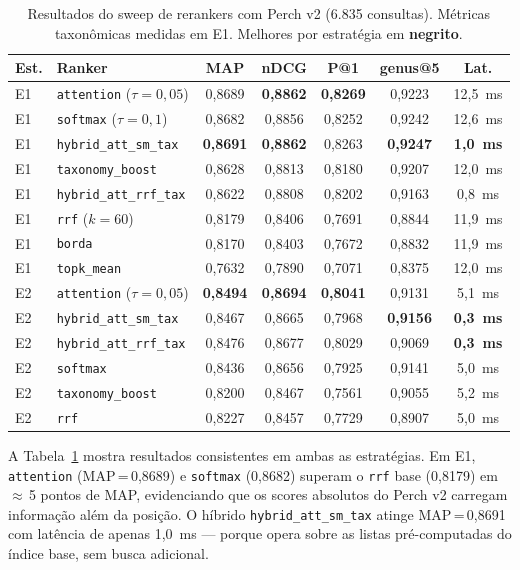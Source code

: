 \documentclass[12pt]{article}
\begin{document}
\begin{table}[H]
\centering
\caption{Resultados do sweep de rerankers com Perch v2 (6.835 consultas).
Métricas taxonômicas medidas em E1. Melhores por estratégia em \textbf{negrito}.}
\label{tab:sweep_perch}
\begin{tabular}{llccccc}
\toprule
\textbf{Est.} & \textbf{Ranker} & \textbf{MAP} & \textbf{nDCG} & \textbf{P@1} & \textbf{genus@5} & \textbf{Lat.} \\
\midrule
E1 & \texttt{attention} ($\tau=0{,}05$)   & 0,8689 & \textbf{0,8862} & \textbf{0,8269} & 0,9223 & 12,5~ms \\
E1 & \texttt{softmax} ($\tau=0{,}1$)      & 0,8682 & 0,8856 & 0,8252 & 0,9242 & 12,6~ms \\
E1 & \texttt{hybrid\_att\_sm\_tax}         & \textbf{0,8691} & \textbf{0,8862} & 0,8263 & \textbf{0,9247} & \textbf{1,0~ms} \\
E1 & \texttt{taxonomy\_boost}             & 0,8628 & 0,8813 & 0,8180 & 0,9207 & 12,0~ms \\
E1 & \texttt{hybrid\_att\_rrf\_tax}        & 0,8622 & 0,8808 & 0,8202 & 0,9163 & 0,8~ms \\
E1 & \texttt{rrf} ($k=60$)                & 0,8179 & 0,8406 & 0,7691 & 0,8844 & 11,9~ms \\
E1 & \texttt{borda}                        & 0,8170 & 0,8403 & 0,7672 & 0,8832 & 11,9~ms \\
E1 & \texttt{topk\_mean}                   & 0,7632 & 0,7890 & 0,7071 & 0,8375 & 12,0~ms \\
\midrule
E2 & \texttt{attention} ($\tau=0{,}05$)   & \textbf{0,8494} & \textbf{0,8694} & \textbf{0,8041} & 0,9131 & 5,1~ms \\
E2 & \texttt{hybrid\_att\_sm\_tax}         & 0,8467 & 0,8665 & 0,7968 & \textbf{0,9156} & \textbf{0,3~ms} \\
E2 & \texttt{hybrid\_att\_rrf\_tax}        & 0,8476 & 0,8677 & 0,8029 & 0,9069 & \textbf{0,3~ms} \\
E2 & \texttt{softmax}                      & 0,8436 & 0,8656 & 0,7925 & 0,9141 & 5,0~ms \\
E2 & \texttt{taxonomy\_boost}             & 0,8200 & 0,8467 & 0,7561 & 0,9055 & 5,2~ms \\
E2 & \texttt{rrf}                          & 0,8227 & 0,8457 & 0,7729 & 0,8907 & 5,0~ms \\
\bottomrule
\end{tabular}
\end{table}

A Tabela~\ref{tab:sweep_perch} mostra resultados consistentes em ambas as
estratégias. Em E1, \texttt{attention} (MAP\,=\,0,8689) e \texttt{softmax}
(0,8682) superam o \texttt{rrf} base (0,8179) em $\approx$\,5 pontos de MAP,
evidenciando que os scores absolutos do Perch v2 carregam informação além da
posição. O híbrido \texttt{hybrid\_att\_sm\_tax} atinge MAP\,=\,0,8691 com
latência de apenas 1,0~ms --- porque opera sobre as listas pré-computadas do
índice base, sem busca adicional.
\end{document}
